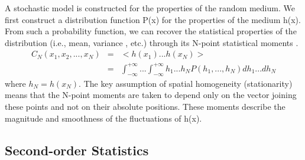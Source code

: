   A stochastic model is constructed for the properties of the random medium.
We first construct a distribution function P(x)
for the properties of the medium h(x). From such a probability function, we
can recover the statistical properties of the distribution (i.e., mean, variance
, etc.) through its N-point statistical moments \cite{Goff}.
\begin{eqnarray}
 C_N(x_1,x_2,...,x_N)& =& <h(x_1)...h(x_N)> \nonumber \\
                     & =& \int_{-\infty}^{+\infty}...\int_{-\infty}^{+\infty}h_1...h_NP(
h_1, ...,h_N)dh_1...dh_N \label {eq1}
\end{eqnarray}
where $h_N=h(x_N)$. The key assumption of spatial homogeneity (stationarity) means that the
N-point moments are taken to depend only on the vector joining these points
and not on their absolute positions. 
These moments describe the magnitude and smoothness of the fluctuations
of h(x).

\subsection{Second-order Statistics}

\par

